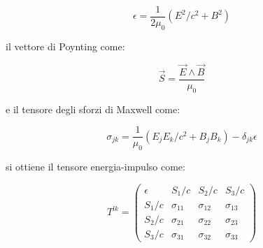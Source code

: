 \documentclass{article}
\begin{document}
\begin{equation}
    \epsilon=\frac{1}{2\mu_0}(E^2/c^2+B^2)
\end{equation}

il vettore di Poynting come:

\begin{equation}
    \vec{S}=\frac{\vec{E}\wedge\vec{B}}{\mu_0}
\end{equation}

e il tensore degli sforzi di Maxwell come:

\begin{equation}
    \sigma_{jk}=\frac{1}{\mu_0}(E_jE_k/c^2+B_jB_k)-\delta_{jk}\epsilon
\end{equation}

si ottiene il tensore energia-impulso come:

\begin{equation}
    T^{lk}=
    \begin{pmatrix}
        \epsilon & S_1/c       & S_2/c       & S_3/c       \\
        S_1/c    & \sigma_{11} & \sigma_{12} & \sigma_{13} \\
        S_2/c    & \sigma_{21} & \sigma_{22} & \sigma_{23} \\
        S_3/c    & \sigma_{31} & \sigma_{32} & \sigma_{33}
    \end{pmatrix}
\end{equation}
\end{document}
